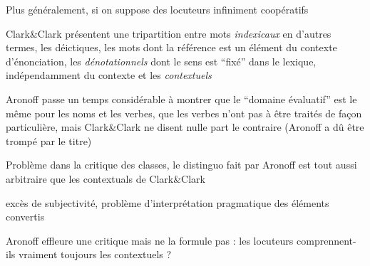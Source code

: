 \documentclass[a4paper,12pt]{article}
\begin{document}
Plus généralement, si on suppose des locuteurs infiniment coopératifs 

 
 
 Clark\&Clark présentent une tripartition entre mots \textit{indexicaux} en d'autres termes, les déictiques, 
 les mots dont la référence est un élément du contexte d'énonciation, les \textit{dénotationnels} dont le sens est ``fixé'' dans le lexique, 
 indépendamment du contexte et les \textit{contextuels}

 Aronoff passe un temps considérable à montrer que le ``domaine évaluatif'' est le même pour les noms et les verbes, que les verbes n'ont pas 
 à être traités de façon particulière, mais Clark\&Clark ne disent nulle part le contraire (Aronoff a dû être trompé par le titre) 
 
 
 
 
 Problème dans la critique des classes, le distinguo fait par Aronoff est tout aussi arbitraire que les contextuals de Clark\&Clark 
 
 excès de subjectivité, problème d'interprétation pragmatique des éléments convertis
 
 Aronoff effleure une critique mais ne la formule pas : les locuteurs comprennent-ils vraiment toujours les contextuels ?
 
  
\end{document}

